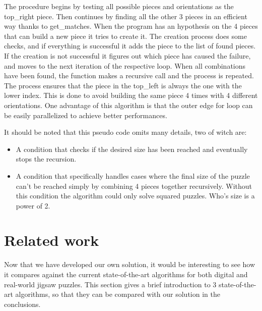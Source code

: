 \documentclass[epsfig,a4paper,11pt,titlepage,twoside,openany]{article}
\begin{document}
The procedure begins by testing all possible pieces and orientations as the top\_right piece.
Then continues by finding all the other 3 pieces in an efficient way thanks to get\_matches.
When the program has an hypothesis on the 4 pieces that can build a new piece it tries to create it.\newline
The creation process does some checks, and if everything is successful it adds the piece to the list of found pieces.
If the creation is not successful it figures out which piece has caused the failure, and moves to the next iteration of the respective loop.\newline
When all combinations have been found, the function makes a recursive call and the process is repeated.\newline
The process ensures that the piece in the top\_left is always the one with the lower index.
This is done to avoid building the same piece 4 times with 4 different orientations.\newline
One advantage of this algorithm is that the outer edge for loop can be easily parallelized to achieve better performances.


It should be noted that this pseudo code omits many details, two of witch are:
\begin{itemize}
  \item A condition that checks if the desired size has been reached and eventually stops the recursion.
  \item A condition that specifically handles cases where the final size of the puzzle can't be reached simply by combining 4 pieces together recursively.
  Without this condition the algorithm could only solve squared puzzles. Who's size is a power of 2. 
\end{itemize}

\cleardoublepage
\section{Related work}\label{document:related_work}
Now that we have developed our own solution, it would be
interesting to see how it compares against the current
state-of-the-art algorithms for both digital and real-world
jigsaw puzzles. This section gives a brief introduction to 3
state-of-the-art algorithms, so that they can be compared with
our solution in the conclusions.
\end{document}

